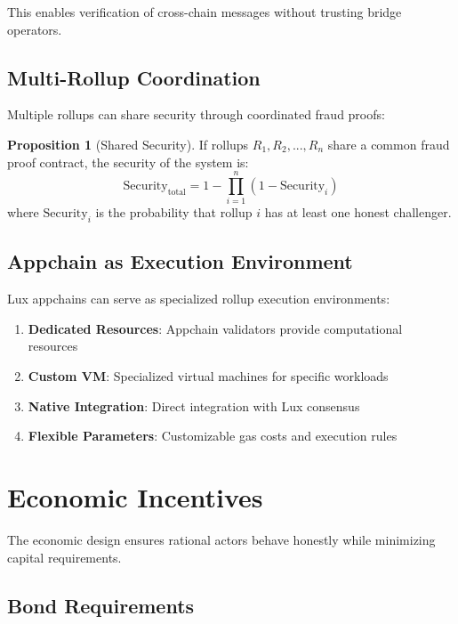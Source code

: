 \documentclass[11pt,a4paper]{article}
\theoremstyle{definition}
\newtheorem{proposition}{Proposition}[section]
\begin{document}
This enables verification of cross-chain messages without trusting bridge operators.

\subsection{Multi-Rollup Coordination}

Multiple rollups can share security through coordinated fraud proofs:

\begin{proposition}[Shared Security]
If rollups $R_1, R_2, ..., R_n$ share a common fraud proof contract, the security of the system is:
\begin{equation}
\text{Security}_{\text{total}} = 1 - \prod_{i=1}^{n}(1 - \text{Security}_i)
\end{equation}
where $\text{Security}_i$ is the probability that rollup $i$ has at least one honest challenger.
\end{proposition}

\subsection{Appchain as Execution Environment}

Lux appchains can serve as specialized rollup execution environments:

\begin{enumerate}
    \item \textbf{Dedicated Resources}: Appchain validators provide computational resources
    \item \textbf{Custom VM}: Specialized virtual machines for specific workloads
    \item \textbf{Native Integration}: Direct integration with Lux consensus
    \item \textbf{Flexible Parameters}: Customizable gas costs and execution rules
\end{enumerate}

\section{Economic Incentives}

The economic design ensures rational actors behave honestly while minimizing capital requirements.

\subsection{Bond Requirements}
\end{document}
